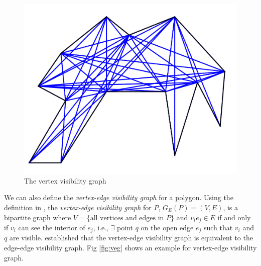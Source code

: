 \documentclass[letterpaper, 10 pt, conference]{ieeeconf}  %
\begin{document}
\begin{figure}
    \includegraphics[width=0.8\linewidth]{images/viz_graph.png}
    \centering
    \caption{The vertex visibility graph}\label{fig:vvg}
    \centering
\end{figure}

We can also define the \textit{vertex-edge visibility graph} for a polygon. Using the definition in \cite{rourke_viz}, the \textit{vertex-edge visibility graph} for $P$, $G_E(P) = (V, E)$, is a bipartite graph where $V = \{\text{all vertices and edges in $P$}\}$ and $v_ie_j\in E$ if and only if $v_i$ can see the interior of $e_j$, i.e., $\exists$ point $q$ on the open edge $e_j$ such that $v_i$ and $q$ are visible. \cite{rourke_viz} established that the vertex-edge visibility graph is equivalent to the edge-edge visibility graph.
Fig \ref{fig:veg} shows an example for vertex-edge visibility graph.
\end{document}
